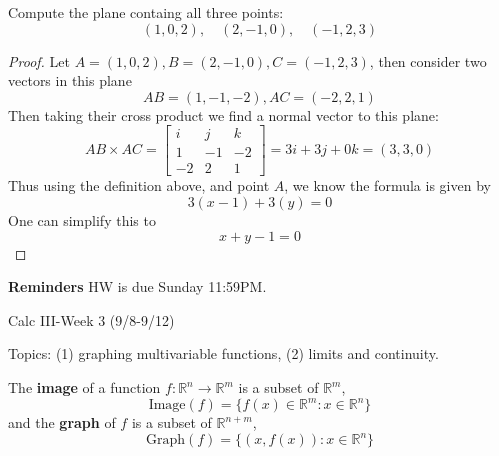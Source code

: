 \documentclass[openany]{book}
\newcommand{\R}{\mathbb{R}}
\begin{document}
\begin{prob}
    Compute the plane containg all three points:
    \begin{equation*}
        (1,0,2), \quad (2, -1, 0), \quad (-1, 2, 3)
    \end{equation*}
\end{prob}
\begin{proof}
    Let $A=(1,0,2), B=(2, -1, 0), C=(-1, 2, 3)$, then consider two vectors in this plane 
    \begin{equation*}
        AB=(1,-1,-2), AC=(-2,2,1)
    \end{equation*}
    Then taking their cross product we find a normal vector to this plane:
    \begin{equation*}
        AB\times AC=\begin{bmatrix}
            i&j&k\\
            1&-1&-2\\
            -2&2&1
        \end{bmatrix}=3i+3j+0k=(3,3,0)
    \end{equation*}
    Thus using the definition above, and point $A$, we know the formula is given by 
    \begin{equation*}
        3(x-1)+3(y)=0
    \end{equation*}
    One can simplify this to 
    \begin{equation*}
        x+y-1=0
    \end{equation*}
\end{proof}

\noindent
\textbf{Reminders}
HW is due Sunday 11:59PM.



\newpage



\begin{center}
    \Large Calc III-Week 3 (9/8-9/12)
\end{center}

\renewcommand\thesection{\arabic{section}}

\noindent
Topics: (1) graphing multivariable functions, (2) limits and continuity.

\begin{defn}[graph]
    The \textbf{image} of a function $f: \R^n\to\R^m$ is a subset of $\R^m$,
    \begin{equation*}
        \text{Image}(f)=\{f(x)\in\R^m: x\in\R^n\}
    \end{equation*}
    and the \textbf{graph} of $f$ is a subset of $\R^{n+m}$,
    \begin{equation*}
        \text{Graph}(f)=\{(x,f(x)): x\in\R^n\}
    \end{equation*}
\end{defn}
\end{document}
